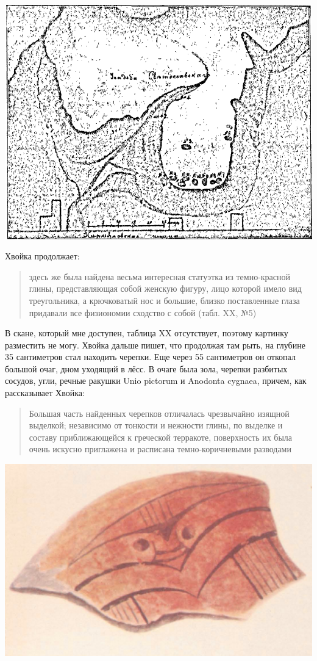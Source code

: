 \begin{center}
\includegraphics[width=\linewidth]{chast-kirvys/svetosl/sveto.png}
\end{center}
 
Хвойка продолжает:

\begin{quotation}
здесь же была найдена весьма интересная статуэтка из темно-красной глины, представляющая собой женскую фигуру, лицо которой имело вид треугольника, а крючковатый нос и большие, близко поставленные глаза придавали все физиономии сходство с собой (табл. XX, №5)
\end{quotation}

В скане, который мне доступен, таблица XX отсутствует, поэтому картинку разместить не могу. Хвойка дальше пишет, что продолжая там рыть, на глубине 35 сантиметров стал находить черепки. Еще через 55 сантиметров он откопал большой очаг, дном уходящий в лёсс. В очаге была зола, черепки разбитых сосудов, угли, речные ракушки Unio pictorum и Anodonta cygnaea, причем, как рассказывает Хвойка:

\begin{quotation}
Большая часть найденных черепков отличалась чрезвычайно изящной выделкой; независимо от тонкости и нежности глины, по выделке и составу приближающейся к греческой терракоте, поверхность их была очень искусно приглажена и расписана темно-коричневыми разводами
\end{quotation}

\begin{center}
\includegraphics[width=0.70\linewidth]{chast-kirvys/svetosl/svet-keramika.png}
\end{center}

